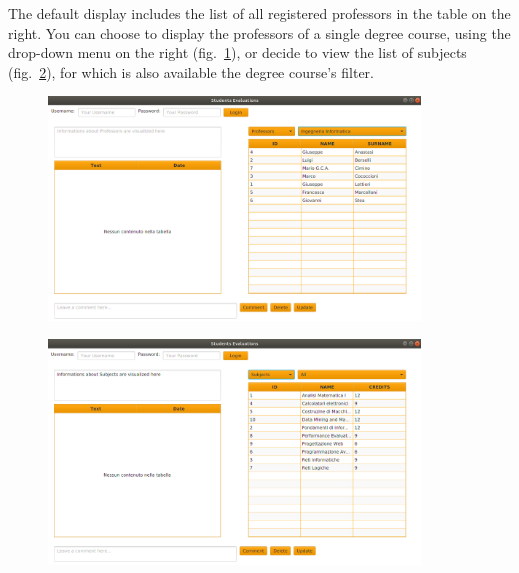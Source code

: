 \documentclass[a4paper]{article}
\begin{document}
The default display includes the list of all registered professors in the table on the right. You can choose to display the professors of a single degree course, using the drop-down menu on the right (fig.~\ref{fig:screen1}), or decide to view the list of subjects (fig.~\ref{fig:screen2}), for which is also available the degree course's filter. 

\begin{figure}[h]
\centering
\includegraphics[width=0.88\textwidth]{images/screens/screen1}
\label{fig:screen1}
\end{figure}
\clearpage
\begin{figure}[h]
\centering
\includegraphics[width=0.88\textwidth]{images/screens/screen2}
\label{fig:screen2}
\end{figure}
\end{document}

